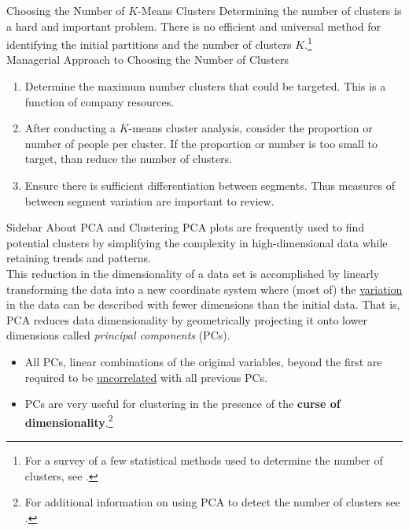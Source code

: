 \documentclass[pdf]{beamer}
\newcommand{\empr}[1]{{\color{franklinblue}\textbf{#1}}}
\theoremstyle{remark}
\theoremstyle{definition}
\begin{document}
\begin{frame}[t]{Choosing the Number of $K$-Means Clusters}
Determining the number of clusters is a hard and important problem.  There is no efficient and universal method for identifying the initial partitions and the number of clusters $K$.\footnote{For a survey of a few statistical methods used to determine the number of clusters, see \cite{chiang2010}.}\\
\vspace{1.5ex}
Managerial Approach to Choosing the Number of Clusters \\
\vspace{0.0ex}
\small
\begin{enumerate}
  \item  Determine the maximum number clusters that could be targeted.  This is a function of company resources. 
  \item  After conducting a $K$-means cluster analysis, consider the proportion or number of people per cluster.  If the proportion or number is too small to target, than reduce the number of clusters.  
  \item Ensure there is sufficient differentiation between segments.  Thus measures of between segment variation are important to review.   
\end{enumerate}
\end{frame}

\begin{frame}[t]{Sidebar About PCA and Clustering}
PCA plots are frequently used to find potential clusters by simplifying the complexity in high-dimensional data while retaining trends and patterns.  \\
\vspace{1.5ex} 
This reduction in  the dimensionality of a data set is accomplished by linearly transforming the data into a new coordinate system where (most of) the \underline{variation} in the data can be described with fewer dimensions than the initial data.  That is, PCA reduces data dimensionality by geometrically projecting it onto lower dimensions called \textit{principal components} (PCs). 
\small
\vspace{-1.0ex}
\begin{itemize}
\item All PCs, linear combinations of the original variables, beyond the first are required to be \underline{uncorrelated} with all previous PCs.
\item  PCs are very useful for clustering in the presence of the \empr{curse of dimensionality}.\footnote{For additional information on using PCA to detect the number of clusters see \cite{lever2017}.} 
\end{itemize}
\end{frame}
\end{document}
